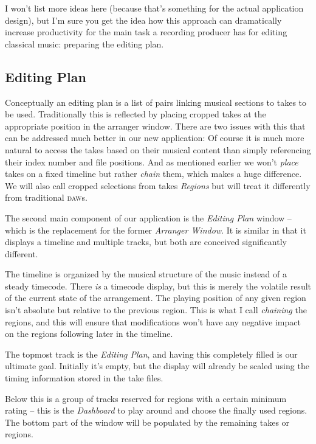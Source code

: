 \documentclass[11pt,a4paper]{article}
\begin{document}
I won't list more ideas here (because that's something for the actual application design), but I'm sure you get the idea how this approach can dramatically increase productivity for the main task a recording producer has for editing classical music: preparing the editing plan.

\subsection{Editing Plan}
Conceptually an editing plan is a list of pairs linking musical sections to takes to be used.
Traditionally this is reflected by placing cropped takes at the appropriate position in the arranger window.
There are two issues with this that can be addressed much better in our new application:
Of course it is much more natural to access the takes based on their musical content than simply referencing their index number and file positions.
And as mentioned earlier we won't \emph{place} takes on a fixed timeline but rather \emph{chain} them, which makes a huge difference.
We will also call cropped selections from takes \emph{Regions} but will treat it differently from traditional \textsc{daw}s.

\medskip
The second main component of our application is the \emph{Editing Plan} window -- which is the replacement for the former \emph{Arranger Window}.
It is similar in that it displays a timeline and multiple tracks, but both are conceived significantly different.

The timeline is organized by the musical structure of the music instead of a steady timecode.
There \emph{is} a timecode display, but this is merely the volatile result of the current state of the arrangement.
The playing position of any given region isn't absolute but relative to the previous region.
This is what I call \emph{chaining} the regions, and this will ensure that modifications won't have any negative impact on the regions following later in the timeline.

The topmost track is the \emph{Editing Plan}, and having this completely filled is our ultimate goal.
Initially it's empty, but the display will already be scaled using the timing information stored in the take files.

Below this is a group of tracks reserved for regions with a certain minimum rating -- this is the \emph{Dashboard} to play around and choose the finally used regions.
The bottom part of the window will be populated by the remaining takes or regions.
\end{document}
